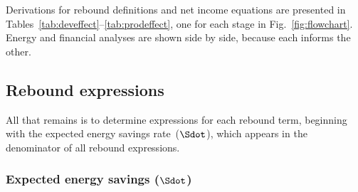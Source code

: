 Derivations for rebound definitions and net income equations
are presented in Tables~\ref{tab:deveffect}--\ref{tab:prodeffect},
one for each stage in Fig.~\ref{fig:flowchart}.
Energy and financial analyses are shown side by side, because
each informs the other.


















\subsection{Rebound expressions}
\label{sec:rebound_expressions}

All that remains is to determine expressions for each rebound term, 
beginning with the expected energy savings rate~($\Sdot$), which
appears in the denominator of all rebound expressions.


\subsubsection{Expected energy savings ($\Sdot$)} 
\label{sec:Sdot}

